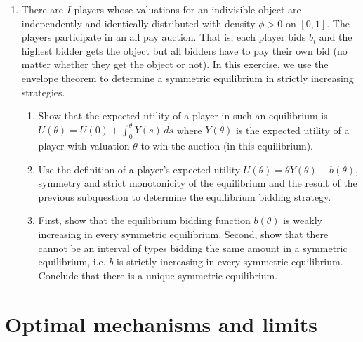 \documentclass[a4paper,12pt]{article}
\begin{document}
\begin{enumerate}
\item There are $I$ players whose valuations for an indivisible object are independently and identically distributed with density $\phi>0$ on $[0,1]$. The players participate in an all pay auction. That is, each player bids $b_i$ and the highest bidder gets the object but all bidders have to pay their own bid (no matter whether they get the object or not). In this exercise, we use the envelope theorem to determine a symmetric equilibrium in strictly increasing strategies.
  \begin{enumerate}
  \item Show that the expected utility of a player in such an equilibrium is $U(\theta)=U(0)+\int_0^\theta Y(s)\,ds$ where $Y(\theta)$ is the expected utility of a player with valuation $\theta$ to win the auction (in this equilibrium).
  \item Use the definition of a player's expected utility $U(\theta)=\theta Y(\theta )-b(\theta )$, symmetry and strict monotonicity of the equilibrium and the result of the previous subquestion to determine the equilibrium bidding strategy.
    \item First, show that the equilibrium bidding function $b(\theta )$ is weakly increasing in every symmetric equilibrium. Second, show that there cannot be an interval of types bidding the same amount in a symmetric equilibrium, i.e. $b$ is strictly increasing in every symmetric equilibrium. Conclude that there is a unique symmetric equilibrium.
    \end{enumerate}
\end{enumerate}

\section{Optimal mechanisms and limits}
\label{sec:optim-mech-limits}
\end{document}
